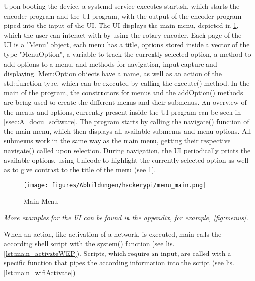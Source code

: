 Upon booting the device, a systemd service executes start.sh, which starts the encoder program and the UI program, with the output of the encoder program piped into the input of the UI.
The UI displays the main menu, depicted in \cref{fig:menu_main}, which the user can interact with by using the rotary encoder.
Each page of the UI is a "Menu" object, each menu has a title, options stored inside a vector of the type "MenuOption", a variable to track the currently selected option, a method to add options to a menu, and methods for navigation, input capture and displaying.
MenuOption objects have a name, as well as an action of the std::function type, which can be executed by calling the execute() method.
In the main of the program, the constructors for menus and the addOption() methods are being used to create the different menus and their submenus.
An overview of the menus and options, currently present inside the UI program can be seen in \cref{ssec:A_docu_software}.
The program starts by calling the navigate() function of the main menu, which then displays all available submenus and menu options.
All submenus work in the same way as the main menu, getting their respective navigate() called upon selection.
During navigation, the UI periodically prints the available options, using Unicode to highlight the currently selected option as well as to give contrast to the title of the menu (see \cref{fig:menu_main}).

\begin{figure}[h]
    \texttt{[image: figures/Abbildungen/hackerypi/menu\_main.png]}
    \centering
    \caption{Main Menu}
    \label{fig:menu_main}
\end{figure}

\textit{More examples for the UI can be found in the appendix, for example, \cref{fig:menus}.}

When an action, like activation of a network, is executed, main calls the according shell script with the system() function (see lis. \ref{lst:main_activateWEP}).
Scripts, which require an input, are called with a specific function that pipes the according information into the script (see lis. \ref{lst:main_wifiActivate}).



